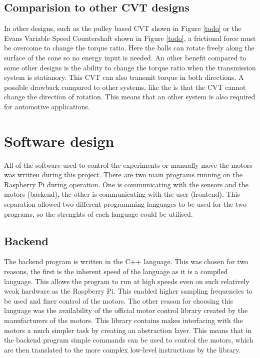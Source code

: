 \documentclass[12pt]{article}
\begin{document}
\subsection{Comparision to other CVT designs}
In other designs, such as the pulley based CVT shown in Figure \ref{todo} or the Evans Variable Speed Countershaft shown in Figure \ref{todo}, a frictional force must be overcome to change the torque ratio. Here the balls can rotate freely along the surface of the cone so no energy input is needed.
An other benefit compared to some other designs is the ability to change the torque ratio when the transmission system is statianory. This CVT can also transmit torque in both directions. 
A possible drawback compared to other systems, like the \todo is that the CVT cannot change the direction of rotation. This means that an other system is also required for automotive applications.




\pagebreak
\section{Software design}
All of the software used to control the experiments or manually move the motors was written during this project. There are two main programs running on the Raspberry Pi during operation. One is communicating with the sensors and the motors (backend), the other is communicating with the user (frontend). This separation allowed two different programming languages to be used for the two programs, so the strenghts of each language could be utilised.

\subsection{Backend}
The backend program is written in the C++ language. This was chosen for two reasons, the first is the inherent speed of the language as it is a compiled language. This allows the program to run at high speeds even on such relatively weak hardware as the Raspberry Pi. This enabled higher sampling frequencies to be used and finer control of the motors. The other reason for choosing this language was the availability of the official motor control library created by the manufacturers of the motors. This library contains makes interfacing with the motors a much simpler task by creating an abstraction layer. This means that in the backend program simple commands can be used to control the motors, which are then translated to the more complex low-level instructions by the library.
\end{document}
